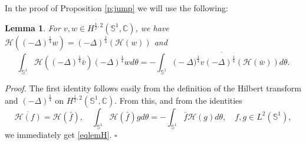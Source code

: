 \documentclass[12pt, a4paper]{article}
\newtheorem{lem}[thm]{Lemma}
\newenvironment{proof}{\noindent\emph{Proof.}}{\hfill$\square$\medskip}
\newcommand{\sph}{\mathbb{S}}
\newcommand{\D}{\Delta}
\newcommand{\blu}[1]{{\color{blue}#1}}
\newcommand{\red}[1]{{\color{red}#1}}
\renewcommand{\(}{\left(}
\renewcommand{\)}{\right)}
\begin{document}
In the proof of Proposition \ref{p:jump} we will use the following:

\begin{lem}\label{Lem-Hilbert} For $v,w\in H^{\frac12,2}(\sph^1,\mathbb{C})$, we have $\mathcal H((-\D)^\frac14 w) =(-\D)^\frac14(\mathcal H (w) )$ and
\begin{equation}\label{eqlemH}
\int_{\sph^1} \mathcal H((-\D)^\frac14 \bar v) (-\D)^\frac14w d\theta=-\overline{\int_{\sph^1}\mathcal (-\D)^\frac14  v (-\D)^\frac14 (\mathcal H (\bar w))d\theta}.
\end{equation}
\end{lem}
\begin{proof} The first identity follows easily from the definition of the Hilbert transform and $(-\Delta)^\frac14$ on $H^{\frac12,2}(\sph^1,\mathbb C)$. From this, and from the identities
$$\overline{\mathcal{H}(f)}=\mathcal{H}(\bar f),\quad \int_{\sph^1}\mathcal{H}(\bar f) gd\theta = -\int_{\sph^1}\bar f\mathcal{H}(g) d\theta,\quad f,g\in L^2(\sph^1),$$
we immediately get \eqref{eqlemH}. %
\end{proof}
\end{document}
